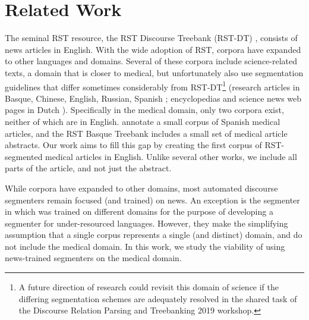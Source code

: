 \section{Related Work}
The seminal RST resource, the RST Discourse Treebank (RST-DT) \cite{Carlson:2001}, consists of news articles in English. With the wide adoption of RST, corpora have expanded to other languages and domains. Several of these corpora include science-related texts, a domain that is closer to medical, but unfortunately also use segmentation guidelines that differ sometimes considerably from RST-DT\footnote{A future direction of research could revisit this domain of science if the differing segmentation schemes are adequately resolved in the shared task of the Discourse Relation Parsing and Treebanking 2019 workshop.} (research articles in Basque, Chinese, English, Russian, Spanish \cite{Iruskieta:2013,Cao:2017,Zeldes:2017,Yang:2018,Toldova:2017,Dacunha:2012}; encyclopedias and science news web pages in Dutch \cite{Redeker:2012}). Specifically in the medical domain, only two corpora exist, neither of which are in English.  annotate a small corpus of Spanish medical articles, and the RST Basque Treebank \cite{Iruskieta:2013} includes a small set of medical article abstracts. Our work aims to fill this gap by creating the first corpus of RST-segmented medical articles in English. Unlike several other works, we include all parts of the article, and not just the abstract.

\medskip
{}
While corpora have expanded to other domains, most automated discourse segmenters remain focused (and trained) on news. An exception is the segmenter in  which was trained on different domains for the purpose of developing a segmenter for under-resourced languages. However, they make the simplifying assumption that a single corpus represents a single (and distinct) domain, and do not include the medical domain. In this work, we study the viability of using news-trained segmenters on the medical domain.




